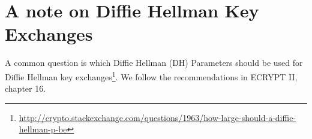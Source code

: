 \section{A note on Diffie Hellman Key Exchanges}
\label{section:DH}

A common question is which Diffie Hellman (DH) Parameters  should be used for Diffie Hellman key exchanges\footnote{\url{http://crypto.stackexchange.com/questions/1963/how-large-should-a-diffie-hellman-p-be}}. We follow the recommendations in ECRYPT II, chapter 16.\cite{ii2011ecrypt}

